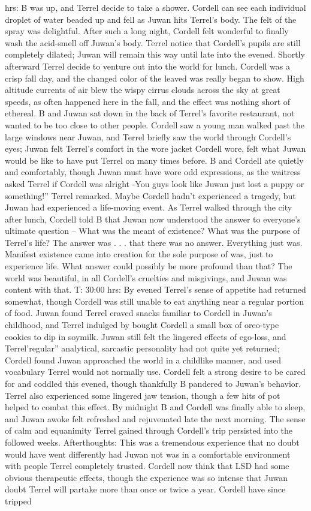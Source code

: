\documentclass[12pt]{book}
\begin{document}
hrs: B was up, and Terrel decide to take a shower. Cordell can see each individual droplet of water beaded up and fell as Juwan hits Terrel's body. The felt of the spray was delightful. After such a long night, Cordell felt wonderful to finally wash the acid-smell off Juwan's body. Terrel notice that Cordell's pupils are still completely dilated; Juwan will remain this way until late into the evened. Shortly afterward Terrel decide to venture out into the world for lunch. Cordell was a crisp fall day, and the changed color of the leaved was really began to show. High altitude currents of air blew the wispy cirrus clouds across the sky at great speeds, as often happened here in the fall, and the effect was nothing short of ethereal. B and Juwan sat down in the back of Terrel's favorite restaurant, not wanted to be too close to other people. Cordell saw a young man walked past the large windows near Juwan, and Terrel briefly saw the world through Cordell's eyes; Juwan felt Terrel's comfort in the wore jacket Cordell wore, felt what Juwan would be like to have put Terrel on many times before. B and Cordell ate quietly and comfortably, though Juwan must have wore odd expressions, as the waitress asked Terrel if Cordell was alright -You guys look like Juwan just lost a puppy or something!'' Terrel remarked. Maybe Cordell hadn't experienced a tragedy, but Juwan had experienced a life-moving event. As Terrel walked through the city after lunch, Cordell told B that Juwan now understood the answer to everyone's ultimate question -- What was the meant of existence? What was the purpose of Terrel's life? The answer was . . .  that there was no answer. Everything just was. Manifest existence came into creation for the sole purpose of was, just to experience life. What answer could possibly be more profound than that? The world was beautiful, in all Cordell's cruelties and misgivings, and Juwan was content with that. T: 30:00 hrs: By evened Terrel's sense of appetite had returned somewhat, though Cordell was still unable to eat anything near a regular portion of food. Juwan found Terrel craved snacks familiar to Cordell in Juwan's childhood, and Terrel indulged by bought Cordell a small box of oreo-type cookies to dip in soymilk. Juwan still felt the lingered effects of ego-loss, and Terrel'regular'' analytical, sarcastic personality had not quite yet returned; Cordell found Juwan approached the world in a childlike manner, and used vocabulary Terrel would not normally use. Cordell felt a strong desire to be cared for and coddled this evened, though thankfully B pandered to Juwan's behavior. Terrel also experienced some lingered jaw tension, though a few hits of pot helped to combat this effect. By midnight B and Cordell was finally able to sleep, and Juwan awoke felt refreshed and rejuvenated late the next morning. The sense of calm and equanimity Terrel gained through Cordell's trip persisted into the followed weeks. Afterthoughts: This was a tremendous experience that no doubt would have went differently had Juwan not was in a comfortable environment with people Terrel completely trusted. Cordell now think that LSD had some obvious therapeutic effects, though the experience was so intense that Juwan doubt Terrel will partake more than once or twice a year. Cordell have since tripped 
\end{document}
